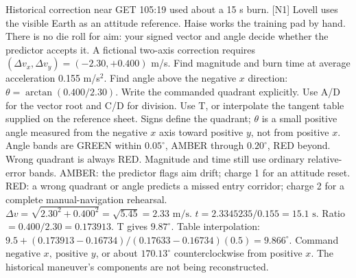 {Historical correction near GET 105:19 used about a 15 s burn. [N1]}
{Lovell uses the visible Earth as an attitude reference.
Haise works the training pad by hand. There is no die roll for aim:
your signed vector and angle decide whether the predictor accepts it.}
{A fictional two-axis correction requires
\((\Delta v_x,\Delta v_y)=(-2.30,+0.400)\) m/s.
Find magnitude and burn time at average acceleration 0.155 m/s\(^{2}\).
Find angle above the negative \(x\) direction:
\(\theta=\arctan(0.400/2.30)\).
Write the commanded quadrant explicitly.}
{Use A/D for the vector root and C/D for division.
Use T, or interpolate the tangent table supplied on the reference sheet.
Signs define the quadrant; \(\theta\) is a small positive angle measured
from the negative \(x\) axis toward positive \(y\), not from positive \(x\).}
{Angle bands are GREEN within \(0.05^\circ\), AMBER through \(0.20^\circ\),
RED beyond. Wrong quadrant is always RED.
Magnitude and time still use ordinary relative-error bands.}
{AMBER: the predictor flags aim drift; charge 1 for an attitude reset.
RED: a wrong quadrant or angle predicts a missed entry corridor;
charge 2 for a complete manual-navigation rehearsal.}
{\(\Delta v=\sqrt{2.30^2+0.400^2}
=\sqrt{5.45}=\boxed{2.33\text{ m/s}}\).
\(t=2.3345235/0.155=\boxed{15.1\text{ s}}\).
Ratio \(=0.400/2.30=0.173913\).
T gives \(\boxed{9.87^\circ}\).
Table interpolation:
\(9.5+(0.173913-0.16734)/(0.17633-0.16734)(0.5)
=9.866^\circ\).
Command \(\boxed{\text{negative }x,\ \text{positive }y}\),
or about \(170.13^\circ\) counterclockwise from positive \(x\).
The historical maneuver's components are not being reconstructed.}

